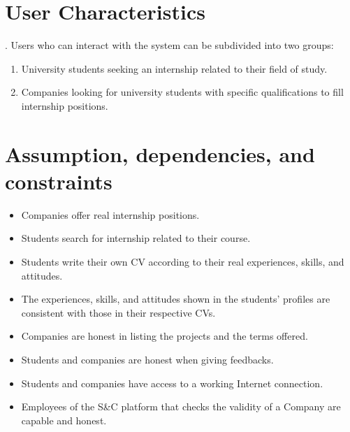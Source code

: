 \section{User Characteristics}. Users who can interact with the system can be subdivided into two groups:
\begin{enumerate}
    \item University students seeking an internship related to their field of study. 
    \item Companies looking for university students with specific qualifications to fill internship positions.
\end{enumerate}



\section{Assumption, dependencies, and constraints}
\begin{itemize}
    \item[\text{[D1]}] Companies offer real internship positions.
    \item[\text{[D2]}] Students search for internship related to their course.
    \item[\text{[D3]}] Students write their own CV according to their real experiences, skills, and attitudes.
    \item[\text{[D4]}] The experiences, skills, and attitudes shown in the students' profiles are consistent with those in their respective CVs.
    \item[\text{[D5]}] Companies are honest in listing the projects and the terms offered.
    \item[\text{[D6]}] Students and companies are honest when giving feedbacks.
    \item[\text{[D7]}] Students and companies have access to a working Internet connection.
    \item[\text{[D8]}] Employees of the S\&C platform that checks the validity of a Company are capable and honest.
\end{itemize}